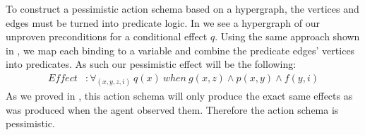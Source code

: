 \documentclass[\master/Master.tex]{subfiles}
\begin{document}
\begin{example} To construct a pessimistic action schema based on a hypergraph, the vertices and edges must be turned into predicate logic.
	In  we see a hypergraph of our unproven preconditions for a conditional effect $q$.
	Using the same approach shown in , we map each binding to a variable and combine the predicate edges' vertices into predicates.
	As such our pessimistic effect will be the following:
	\begin{equation*}
	\begin{split}	
	Effect&: \forall_{(x,y,z,i)} ~q(x)~ when~ g(x,z) \land p(x,y) \land f(y,i)
	\end{split}
	\end{equation*}	
	As we proved in , this action schema will only produce the exact same effects as was produced when the agent observed them. Therefore the action schema is pessimistic.
\end{example}
\end{document}

